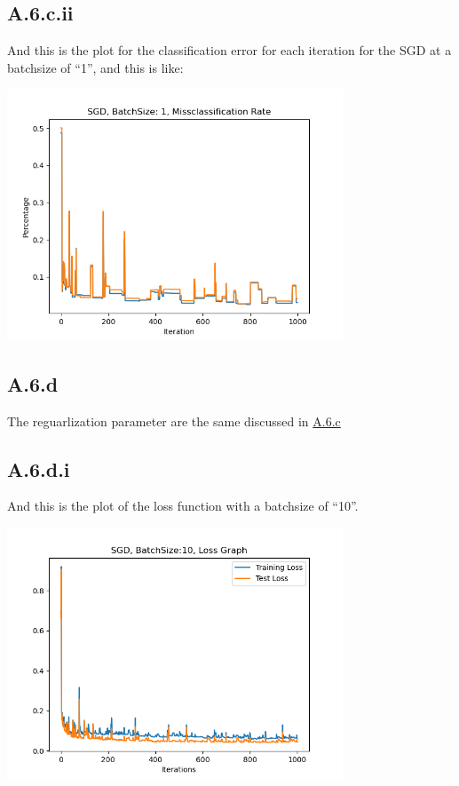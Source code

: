 \documentclass[]{article}
\begin{document}
    \subsection*{A.6.c.ii}
        And this is the plot for the classification error for each iteration for the SGD at a batchsize of ``1'', and this is like: 
        \begin{center}
            \includegraphics[width=10cm]{A6-sgd-1-classification.png}
        \end{center}
    \subsection*{A.6.d}
        The reguarlization parameter are the same discussed in \hyperref[sec:A.6.c]{A.6.c}
    \subsection*{A.6.d.i}
        And this is the plot of the loss function with a batchsize of ``10''. 
        \begin{center}
            \includegraphics[width=10cm]{A6-sgd-10-loss.png}
        \end{center}
\end{document}
